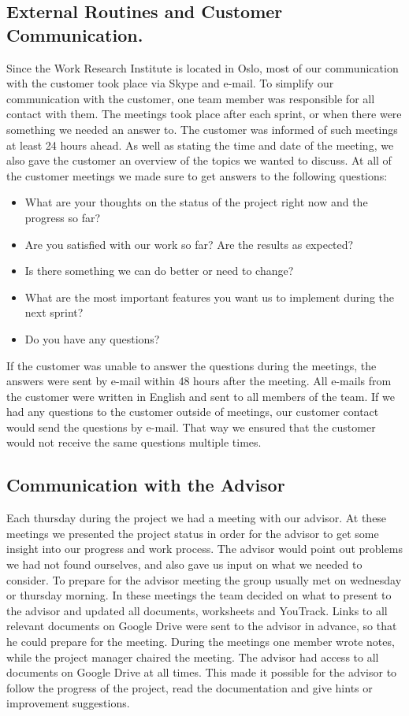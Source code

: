 \subsection{External Routines and Customer Communication.}
\label{subsec:PlanningQualityExternal}
Since the Work Research Institute is located in Oslo, most of our communication with the customer took place via Skype and e-mail. To simplify our communication with the customer, one team member was responsible for all contact with them. The meetings took place after each sprint, or when there were something we needed an answer to. The customer was informed of such meetings at least 24 hours ahead. As well as stating the time and date of the meeting, we also gave the customer an overview of the topics we wanted to discuss. At all of the customer meetings we made sure to get answers to the following questions:
\begin{itemize}
\item What are your thoughts on the status of the project right now and the progress so far?
\item Are you satisfied with our work so far? Are the results as expected?
\item Is there something we can do better or need to change?
\item What are the most important features you want us to implement during the next sprint?
\item Do you have any questions?
\end{itemize}
If the customer was unable to answer the questions during the meetings, the answers were sent by e-mail within 48 hours after the meeting. All e-mails from the customer were written in English and sent to all members of the team. If we had any questions to the customer outside of meetings, our customer contact would send the questions by e-mail. That way we ensured that the customer would not receive the same questions multiple times.

\subsection{Communication with the Advisor}
\label{subsec:PlanningQualityAdvisor}
Each thursday during the project we had a meeting with our advisor. At these meetings we presented the project status in order for the advisor to get some insight into our progress and work process. The advisor would point out problems we had not found ourselves, and also gave us input on what we needed to consider. To prepare for the advisor meeting the group usually met on wednesday or thursday morning. In these meetings the team decided on what to present to the advisor and updated all documents, worksheets and YouTrack. Links to all relevant documents on Google Drive were sent to the advisor in advance, so that he could prepare for the meeting. During the meetings one member wrote notes, while the project manager chaired the meeting. The advisor had access to all documents on Google Drive at all times. This made it possible for the advisor to follow the progress of the project, read the documentation and give hints or improvement suggestions.

